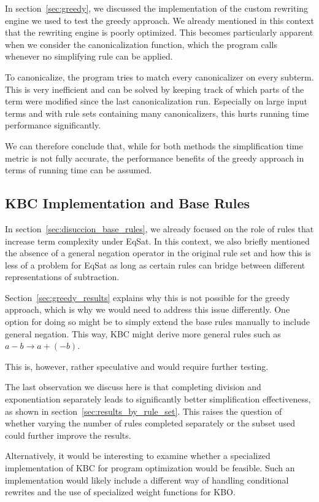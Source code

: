 In section~\ref{sec:greedy}, we discussed the implementation of the custom rewriting engine we used to test the greedy approach. We already mentioned in this context that the rewriting engine is poorly optimized. This becomes particularly apparent when we consider the canonicalization function, which the program calls whenever no simplifying rule can be applied. 

To canonicalize, the program tries to match every canonicalizer on every subterm. This is very inefficient and can be solved by keeping track of which parts of the term were modified since the last canonicalization run. Especially on large input terms and with rule sets containing many canonicalizers, this hurts running time performance significantly. 

We can therefore conclude that, while for both methods the simplification time metric is not fully accurate, the performance benefits of the greedy approach in terms of running time can be assumed. 

\subsection{KBC Implementation and Base Rules}
In section~\ref{sec:disuccion_base_rules}, we already focused on the role of rules that increase term complexity under EqSat. In this context, we also briefly mentioned the absence of a general negation operator in the original rule set and how this is less of a problem for EqSat as long as certain rules can bridge between different representations of subtraction.

Section~\ref{sec:greedy_results} explains why this is not possible for the greedy approach, which is why we would need to address this issue differently. One option for doing so might be to simply extend the base rules manually to include general negation. This way, KBC might derive more general rules such as $a - b \to a + (-b)$. 

This is, however, rather speculative and would require further testing. 

The last observation we discuss here is that completing division and exponentiation separately leads to significantly better simplification effectiveness, as shown in section~\ref{sec:results_by_rule_set}. This raises the question of whether varying the number of rules completed separately or the subset used could further improve the results.

Alternatively, it would be interesting to examine whether a specialized implementation of KBC for program optimization would be feasible. Such an implementation would likely include a different way of handling conditional rewrites and the use of specialized weight functions for KBO. 

